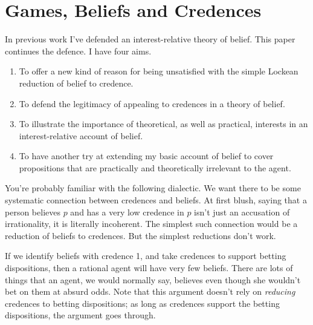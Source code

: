 \chapter{Games, Beliefs and Credences}

\newcommand{\RG}{{\sc Red-Green}}


In previous work \citep{Weatherson2005-WEACWD, Weatherson2011-WEADIR, Weatherson2012-WEAKBI} I've defended an interest-relative theory of belief. This paper continues the defence. I have four aims.

\begin{enumerate}
\item To offer a new kind of reason for being unsatisfied with the simple Lockean reduction of belief to credence.
\item To defend the legitimacy of appealing to credences in a theory of belief.
\item To illustrate the importance of theoretical, as well as practical, interests in an interest-relative account of belief.
\item To have another try at extending my basic account of belief to cover propositions that are practically and theoretically irrelevant to the agent.
\end{enumerate}

\noindent You're probably familiar with the following dialectic. We want there to be some systematic connection between credences and beliefs. At first blush, saying that a person believes $p$ and has a very low credence in $p$ isn't just an accusation of irrationality, it is literally incoherent. The simplest such connection would be a reduction of beliefs to credences. But the simplest reductions don't work. 

If we identify beliefs with credence 1, and take credences to support betting dispositions, then a rational agent will have very few beliefs. There are lots of things that an agent, we would normally say, believes even though she wouldn't bet on them at absurd odds. Note that this argument doesn't rely on \textit{reducing} credences to betting dispositions; as long as credences support the betting dispositions, the argument goes through.

